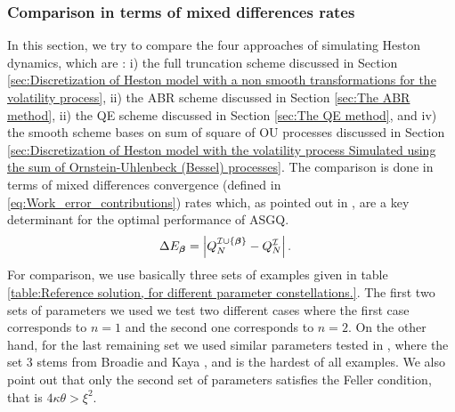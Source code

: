 \subsubsection{Comparison in terms of mixed differences rates}\label{sec:Comparison in terms of mixed differences rates}
In this section, we try to compare  the four  approaches of simulating Heston dynamics, which are : i) the full truncation scheme discussed in Section \ref{sec:Discretization of Heston model with a non smooth transformations for the volatility process},  ii) the ABR scheme discussed in Section \ref{sec:The ABR method},  ii) the QE scheme discussed in Section \ref{sec:The QE method}, and iv) the smooth scheme bases on sum of square of OU processes discussed in Section \ref{sec:Discretization of Heston model with the volatility process Simulated using the sum of  Ornstein-Uhlenbeck (Bessel) processes}. The comparison is done in terms of mixed differences convergence (defined in \eqref{eq:Work_error_contributions}) rates  which, as pointed out in \cite{haji2016multi}, are a key determinant for the optimal performance of ASGQ.
\begin{align}\label{eq:Work_error_contributions}
\Delta E_{\boldsymbol{\beta}} &= \left\lvert Q^{\mathcal{I} \cup \{\boldsymbol{\beta}\}}_N-Q^{\mathcal{I}}_N\right\rvert.
\end{align}
For comparison, we use basically three sets of examples  given in table \ref{table:Reference solution, for different parameter constellations.}. The first two sets of parameters we used we test two different cases where the first case corresponds to $n=1$ and the second one corresponds to $n=2$. On the other hand, for the last remaining set we used similar parameters tested in \cite{lord2010comparison}, where the set $3$  stems from Broadie and Kaya \cite{broadie2006exact}, and is the hardest of all examples.   We also point out that only the second set of parameters  satisfies the Feller condition, that is $4 \kappa \theta > \xi^2$.


